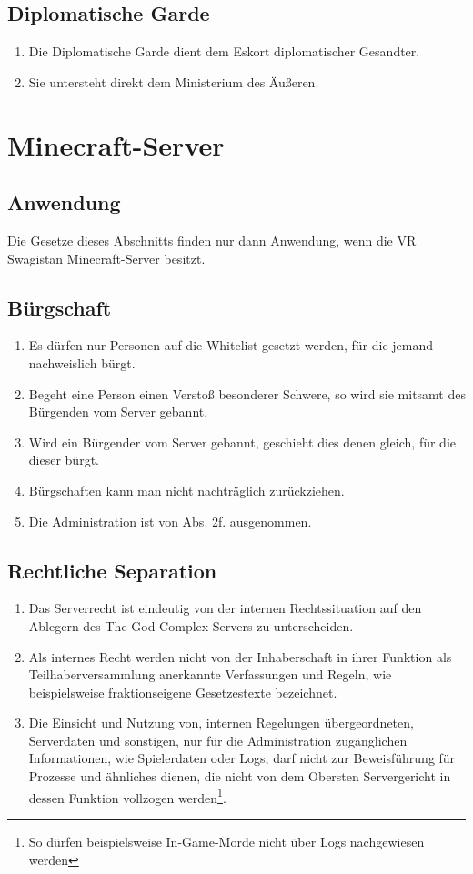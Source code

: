 \documentclass{article}
\begin{document}
\subsection{Diplomatische Garde}
\begin{enumerate}[(1)]
	\item Die Diplomatische Garde dient dem Eskort diplomatischer Gesandter.
	\item Sie untersteht direkt dem Ministerium des Äußeren.
\end{enumerate}

\section{Minecraft-Server}

\subsection{Anwendung}
Die Gesetze dieses Abschnitts finden nur dann Anwendung, wenn die VR Swagistan Minecraft-Server besitzt.

\subsection{Bürgschaft}
\begin{enumerate}[(1)]
	\item Es dürfen nur Personen auf die Whitelist gesetzt werden, für die jemand nachweislich bürgt.
	\item Begeht eine Person einen Verstoß besonderer Schwere, so wird sie mitsamt des Bürgenden vom Server gebannt.
	\item Wird ein Bürgender vom Server gebannt, geschieht dies denen gleich, für die dieser bürgt.
	\item Bürgschaften kann man nicht nachträglich zurückziehen.
	\item Die Administration ist von Abs. 2f. ausgenommen.
\end{enumerate}

\subsection{Rechtliche Separation}
\begin{enumerate}[(1)]
	\item Das Serverrecht ist eindeutig von der internen Rechtssituation auf den Ablegern des The God Complex Servers zu unterscheiden.
	\item Als internes Recht werden nicht von der Inhaberschaft in ihrer Funktion als Teilhaberversammlung anerkannte Verfassungen und Regeln, wie beispielsweise fraktionseigene Gesetzestexte bezeichnet.
	\item Die Einsicht und Nutzung von, internen Regelungen übergeordneten, Serverdaten und sonstigen, nur für die Administration zugänglichen Informationen, wie Spielerdaten oder Logs, darf nicht zur Beweisführung für Prozesse und ähnliches dienen, die nicht von dem Obersten Servergericht in dessen Funktion vollzogen werden\footnote{So dürfen beispielsweise In-Game-Morde nicht über Logs nachgewiesen werden}.
\end{enumerate}
\end{document}
